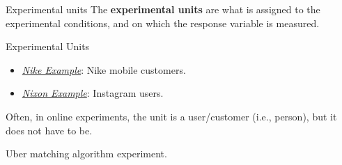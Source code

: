 \begin{Definition}{Experimental units}{}
    The \textbf{experimental units} are what is assigned to the experimental conditions,
    and on which the response variable is measured.
\end{Definition}
\begin{Example}{Experimental Units}{}
    \begin{itemize}
        \item \emph{\hyperref[ex:nike_ex]{Nike Example}}: Nike mobile customers.
        \item \emph{\hyperref[ex:nixon_ex]{Nixon Example}}: Instagram users.
    \end{itemize}
\end{Example}
\begin{Remark}{}{}
    Often, in online experiments, the unit is a user/customer (i.e., person), but it does
    not have to be.
    \begin{Example}{}{}
        Uber matching algorithm experiment.
    \end{Example}
\end{Remark}
